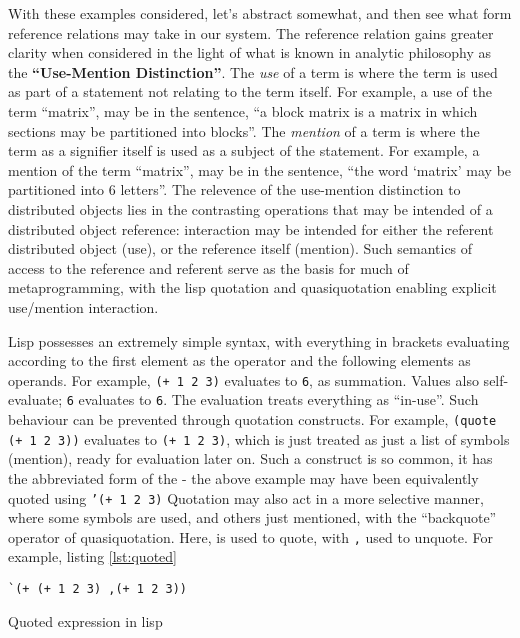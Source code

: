 With these examples considered, let's abstract somewhat, and then see
what form reference relations may take in our system. The reference
relation gains greater clarity when considered in the light of what is
known in analytic philosophy as the \textbf{``Use-Mention
    Distinction''}. The \emph{use} of a term is where the term is used as
part of a statement not relating to the term itself. For example, a use
of the term ``matrix'', may be in the sentence, ``a block matrix is a
matrix in which sections may be partitioned into blocks''. The
\emph{mention} of a term is where the term as a signifier itself is used
as a subject of the statement. For example, a mention of the term
``matrix'', may be in the sentence, ``the word `matrix' may be
partitioned into 6 letters''. The relevence of the use-mention
distinction to distributed objects lies in the contrasting operations
that may be intended of a distributed object reference: interaction may
be intended for either the referent distributed object (use), or the
reference itself (mention). Such semantics of access to the reference
and referent serve as the basis for much of metaprogramming, with the
lisp quotation and quasiquotation enabling explicit use/mention
interaction.

Lisp possesses an extremely simple syntax, with everything in brackets
evaluating according to the first element as the operator and the
following elements as operands. For example, \texttt{(+ 1 2 3)}
evaluates to \texttt{6}, as summation. Values also self-evaluate;
\texttt{6} evaluates to \texttt{6}. The evaluation treats everything as
``in-use''. Such behaviour can be prevented through quotation
constructs. For example, \texttt{(quote (+ 1 2 3))} evaluates to
\texttt{(+ 1 2 3)}, which is just treated as just a list of symbols
(mention), ready for evaluation later on. Such a construct is so common,
it has the abbreviated form of the \texttt{\textquotesingle{}} - the
above example may have been equivalently quoted using
\texttt{'(+ 1 2 3)} Quotation may also act in a
more selective manner, where some symbols are used, and others just
mentioned, with the ``backquote'' operator of quasiquotation. Here,
\texttt{\textasciigrave{}} is used to quote, with \texttt{,} used to
unquote. For example, listing \ref{lst:quoted}

\begin{listing}
    \begin{verbatim}
`(+ (+ 1 2 3) ,(+ 1 2 3))
    \end{verbatim}
    \caption{Quoted expression in lisp}
    \label{lst:quoted}
\end{listing}


